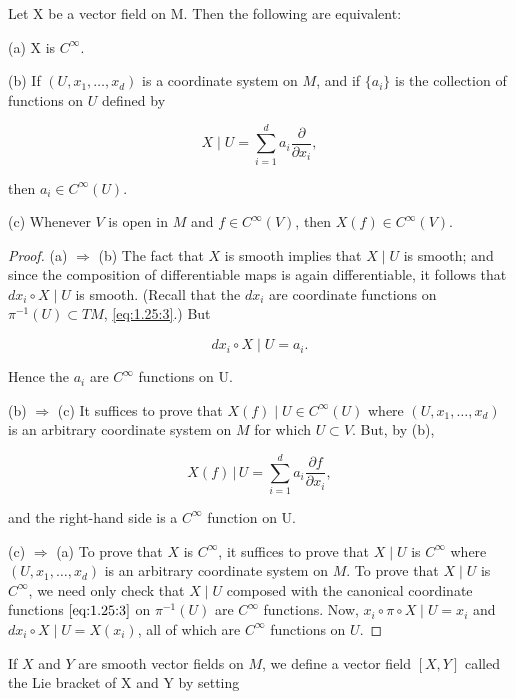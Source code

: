 \begin{proposition}\label{thm:1.43}
	Let X be a vector field on M. Then the following are equivalent:

	(a) X is  $ C^{\infty} $.

	(b) If $(U, x_{1}, \ldots, x_{d})$ is a coordinate system on $M$, and if $\{a_{i}\}$ is the collection of functions on $U$ defined by

	\[
		X\mid U=\sum_{i=1}^{d}a_{i}\frac{\partial}{\partial x_{i}},
	\]

	then  $ a_{i} \in C^{\infty}(U) $.

	(c) Whenever $V$ is open in $M$ and $f\in C^{\infty}(V)$, then $X(f)\in C^{\infty}(V)$.

\end{proposition}

\begin{proof}
	(a) $\Rightarrow$ (b) The fact that $X$ is smooth implies that $X \mid U$ is smooth; and since the composition of differentiable maps is again differentiable, it follows that $dx_i \circ X \mid U$ is smooth. (Recall that the $dx_i$ are coordinate functions on $\pi^{-1}(U) \subset TM$, \eqref{eq:1.25:3}.) But 

	\[
		d x_{i}\circ X\mid U=a_{i}.
	\]

	Hence the  $ a_{i} $ are  $ C^{\infty} $ functions on U.

	(b) $\Rightarrow$ (c) It suffices to prove that $X(f) \mid U \in C^{\infty}(U)$ where $(U, x_{1}, \ldots, x_{d})$ is an arbitrary coordinate system on $M$ for which $U \subset V$. But, by (b),

	\[
		X(f)\,|\,U=\sum_{i=1}^{d}a_{i}\frac{\partial f}{\partial x_{i}},
	\]

	and the right-hand side is a  $ C^{\infty} $ function on U.

	(c) $\Rightarrow$ (a) To prove that $X$ is $C^{\infty}$, it suffices to prove that $X\mid U$ is $C^{\infty}$ where $(U, x_1, \ldots, x_d)$ is an arbitrary coordinate system on $M$. To prove that $X\mid U$ is $C^{\infty}$, we need only check that $X\mid U$ composed with the canonical coordinate functions $\eqref{eq:1.25:3}$ on $\pi^{-1}(U)$ are $C^{\infty}$ functions. Now, $x_i \circ \pi \circ X\mid U = x_i$ and $dx_i \circ X\mid U = X(x_i)$, all of which are $C^{\infty}$ functions on $U$.
\end{proof}

\label{thm:1.44}
If $X$ and $Y$ are smooth vector fields on $M$, we define a vector field  $ [X,Y] $ called the Lie bracket of X and Y by setting 

